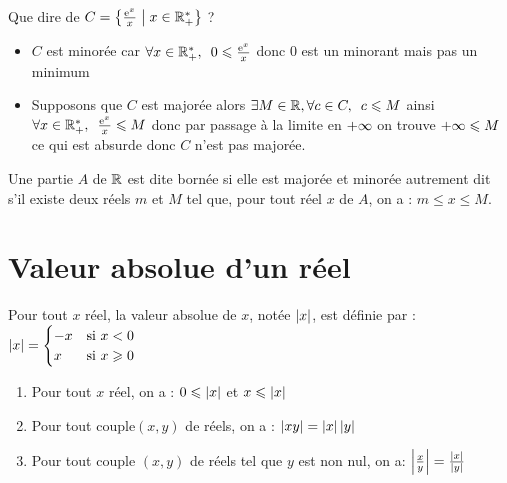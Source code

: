 \begin{exoex}
        ~\\
	Que dire de \(C = \left\lbrace\frac{\mathrm{e}^{x}}{x} \;\middle|\; x \in \mathbb{R}_+^*\right\rbrace\) ?
\end{exoex}

\begin{corr}
	\begin{itemize}

		\item \(C\) est minorée car \( \quantifs{\forall x \in \Rps} 0 \leq \frac{\e{x}}{x} \) donc \(0\) est un minorant mais pas un minimum  \\
		\item Supposons que \(C\) est majorée alors \(\quantifs{\exists M \in \R,\forall c \in C} c\leq M \) ainsi \(\quantifs{\forall x \in \Rps} \frac{\e{x}}{x} \leq M \) donc par passage à la limite en \(+\infty\) on trouve \(+\infty \leqslant M\) ce qui est absurde donc \(C\) n'est pas majorée.
	\end{itemize}
\end{corr}

\begin{defi}
	Une partie \(A\) de \(\mathbb{R}\) est dite bornée si elle est majorée et minorée autrement dit s’il existe deux réels \(m\) et \(M\) tel que, pour tout réel \(x\) de \(A\), on a : \(m\leq x \leq M\).
\end{defi}

\section{Valeur absolue d'un réel}
\begin{defi}
	Pour tout \(x\) réel, la valeur absolue de \(x\), notée \(\left\lvert x\right\rvert\), est définie par : \(\left\lvert x\right\rvert = \begin{cases}
		-x & \text{si }  x < 0   \\
		x  & \text{si }  x\geqslant 0 \\
	\end{cases}\)
\end{defi}

\begin{prop}
	\begin{enumerate}
		\item Pour tout \(x\) réel, on a : \(0\leqslant\left\lvert x\right\rvert\) et \(x\leqslant\left\lvert x\right\rvert\)
		\item Pour tout couple\((x,y)\) de réels, on a : \(\left\lvert xy\right\rvert = \left\lvert x\right\rvert\left\lvert y\right\rvert\)
		\item Pour tout couple \((x,y)\) de réels tel que \(y\) est non nul, on a: \(\left\lvert\frac{x}{y}\right\rvert = \frac{\left\lvert x\right\rvert}{\left\lvert y\right\rvert}\)
	\end{enumerate}
\end{prop}

